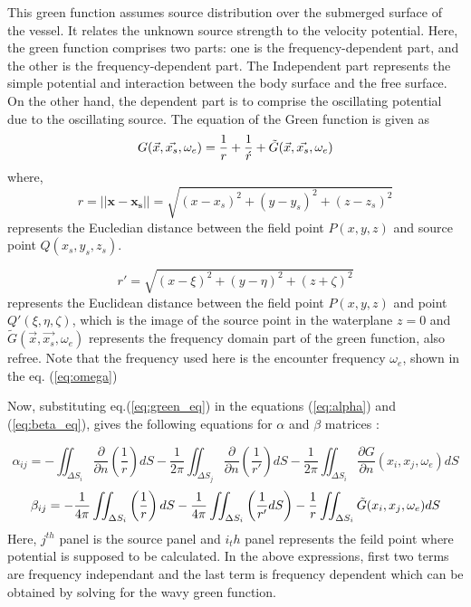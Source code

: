 This green function assumes source distribution over the submerged surface of the vessel. It relates the unknown source strength to the velocity potential. Here, the green function comprises two parts: one is the frequency-dependent part, and the other is the frequency-dependent part.  The Independent part represents the simple potential and interaction between the body surface and the free surface. On the other hand, the dependent part is to comprise the oscillating potential due to the oscillating source.
The equation of the Green function is given as 
\begin{equation}
    \label{eq:green_eq}
    G(\vec{x}, \vec{x_s}, \omega_e) = \frac{1}{r} + \frac{1}{\acute{r}} + \Tilde{G}(\vec{x}, \vec{x_s}, \omega_e) 
\end{equation}
where, 
\begin{equation}
    r = ||\boldsymbol{x} - \boldsymbol{x_s}|| = \sqrt{(x-x_s)^2+(y-y_s)^2+(z-z_s)^2}
\end{equation}
represents the Eucledian distance between the field point $P(x, y, z)$ and source point $Q(x_s, y_s, z_s)$.

\begin{equation}
    r' = \sqrt{(x - \xi)^2 + (y - \eta)^2 + (z + \zeta)^2}   
\end{equation}
represents the Euclidean distance between the field point $P(x, y, z)$ and point $Q'(\xi, \eta, \zeta)$, which is the image of the source point in the waterplane $z=0$ and $\tilde{G}(\vec{x}, \vec{x_s}, \omega_e)$ represents the frequency domain part of the green function, also refree. Note that the frequency used here is the encounter frequency $\omega_e$, shown in the eq. (\ref{eq:omega})

Now, substituting eq.(\ref{eq:green_eq}) in the equations (\ref{eq:alpha}) and (\ref{eq:beta_eq}), gives the following equations for $\alpha$ and $\beta$ matrices :

\begin{equation}
    \alpha_{ij} = -\iint_{\Delta S_i} \frac{\partial}{\partial n}\left(\frac{1}{r}\right) dS - \frac{1}{2\pi}\iint_{\Delta S_j} \frac{\partial}{\partial n}\left(\frac{1}{r'}\right) dS
    - \frac{1}{2\pi}\iint_{\Delta S_i} \frac{\partial G}{\partial n}(x_i, x_j, \omega_e) dS
\end{equation}
\begin{equation}
    \beta_{ij} = -\frac{1}{4\pi}\iint_{\Delta S_i}\left(\frac{1}{r}\right) dS - \frac{1}{4\pi}\iint_{\Delta S_i}\left(\frac{1}{r'}dS\right)-\frac{1}{r}\iint_{\Delta S_i} \Tilde{G}(x_i, x_j, \omega_e)dS
\end{equation}
Here, $j^{th}$ panel is the source panel and $i_th$ panel represents the feild point where potential is supposed to be calculated. In the above expressions, first two terms are frequency independant and the last term is frequency dependent which can be obtained by solving for the wavy green function.

